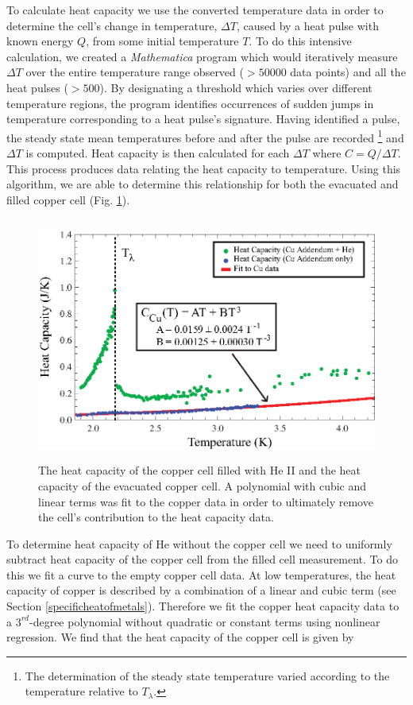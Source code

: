 To calculate heat capacity we use the converted temperature data in order to determine the cell's change in temperature, $\Delta T$, caused by a heat pulse with known energy $Q$, from some initial temperature $T$. To do this intensive calculation, we created a \emph{Mathematica} program which would iteratively measure $\Delta T$ over the entire temperature range observed ($>50000$ data points) and all the heat pulses ($>500$). By designating a threshold which varies over different temperature regions, the program identifies occurrences of sudden jumps in temperature corresponding to a heat pulse's signature. Having identified a pulse, the steady state mean temperatures before and after the pulse are recorded \footnote{The determination of the steady state temperature varied according to the temperature relative to $T_{\lambda}$.} and $\Delta T$ is computed.  Heat capacity is then calculated for each $\Delta T$ where $C=Q/\Delta T$.  This process produces data relating the heat capacity to temperature.  Using this algorithm, we are able to determine this relationship for both the evacuated and filled copper cell (Fig. \ref{fig:lambdanorm}).
\begin{figure}[htbp]
\begin{center}
\includegraphics[height=80mm]{./figures/lambdanorm.eps}
\caption{\small{The heat capacity of the copper cell filled with He II and the heat capacity of the evacuated copper cell.  A polynomial with cubic and linear terms was fit to the copper data in order to ultimately remove the cell's contribution to the heat capacity data.}}
\label{fig:lambdanorm}
\end{center}
\end{figure}

To determine heat capacity of He without the copper cell we need to uniformly subtract heat capacity of the copper cell from the filled cell measurement.  To do this we fit a curve to the empty copper cell data.  At low temperatures, the heat capacity of copper is described by a combination of a linear and cubic term (see Section \ref{specificheatofmetals}).  Therefore we fit the copper heat capacity data to a $3^{rd}$-degree polynomial without  quadratic or constant terms using nonlinear regression.  We find that the heat capacity of the copper cell is given by


